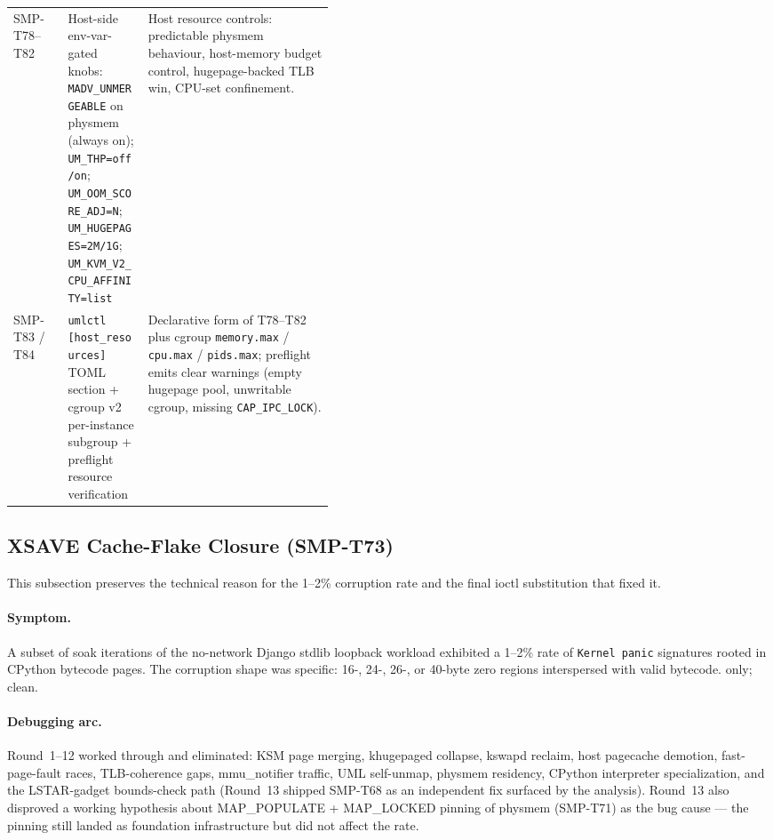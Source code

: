 \begin{table}[h]
\begin{tabularx}{\linewidth}{@{}p{0.17\linewidth}p{0.25\linewidth}X@{}}
SMP-T78--T82 & Host-side env-var-gated knobs: \texttt{MADV\_UNMERGEABLE} on physmem (always on); \texttt{UM\_THP=off/on}; \texttt{UM\_OOM\_SCORE\_ADJ=N}; \texttt{UM\_HUGEPAGES=2M/1G}; \texttt{UM\_KVM\_V2\_CPU\_AFFINITY=list} & Host resource controls: predictable physmem behaviour, host-memory budget control, hugepage-backed TLB win, CPU-set confinement. \\
SMP-T83 / T84 & \texttt{umlctl [host\_resources]} TOML section + cgroup v2 per-instance subgroup + preflight resource verification & Declarative form of T78--T82 plus cgroup \texttt{memory.max} / \texttt{cpu.max} / \texttt{pids.max}; preflight emits clear warnings (empty hugepage pool, unwritable cgroup, missing \texttt{CAP\_IPC\_LOCK}). \\
\bottomrule
\end{tabularx}
\end{table}

\subsection{XSAVE Cache-Flake Closure (SMP-T73)}
\label{subsec:r14-saga}

This subsection preserves the technical reason for the 1--2\%
corruption rate and the final ioctl substitution that fixed it.

\paragraph{Symptom.} A subset of soak iterations of the no-network
Django stdlib loopback workload exhibited a 1--2\% rate of
\texttt{Kernel panic} signatures rooted in CPython bytecode pages.
The corruption shape was specific: 16-, 24-, 26-, or 40-byte zero
regions interspersed with valid bytecode. \KVMvTwo{} only;
\Seccomp{} clean.

\paragraph{Debugging arc.}
Round~1--12 worked through and eliminated: KSM page merging,
khugepaged collapse, kswapd reclaim, host pagecache demotion,
fast-page-fault races, TLB-coherence gaps, mmu\_notifier traffic,
UML self-unmap, physmem residency, CPython interpreter
specialization, and the LSTAR-gadget bounds-check path (Round~13
shipped SMP-T68 as an independent fix surfaced by the
analysis). Round~13 also disproved a working hypothesis
about MAP\_POPULATE + MAP\_LOCKED pinning of physmem (SMP-T71)
as the bug cause --- the pinning still landed as foundation
infrastructure but did not affect the rate.

